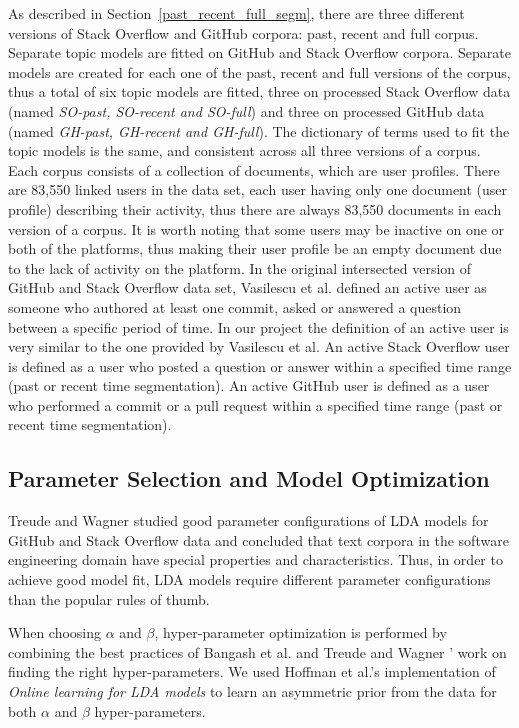         As described in Section~\ref{past_recent_full_segm}, there are three different versions of Stack Overflow and GitHub corpora: past, recent and full corpus. Separate topic models are fitted on GitHub and Stack Overflow corpora. Separate models are created for each one of the past, recent and full versions of the corpus, thus a total of six topic models are fitted, three on processed Stack Overflow data (named \emph{SO-past, SO-recent and SO-full}) and three on processed GitHub data (named \emph{GH-past, GH-recent and GH-full}). The dictionary of terms used to fit the topic models is the same, and consistent across all three versions of a corpus. Each corpus consists of a collection of documents, which are user profiles. There are 83,550 linked users in the data set, each user having only one document (user profile) describing their activity, thus there are always 83,550 documents in each version of a corpus. It is worth noting that some users may be inactive on one or both of the platforms, thus making their user profile be an empty document due to the lack of activity on the platform. In the original intersected version of GitHub and Stack Overflow data set, Vasilescu et al. \cite{vasilescu2013stackoverflow} defined an active user as someone who authored at least one commit, asked or answered a question between a specific period of time. In our project the definition of an active user is very similar to the one provided by Vasilescu et al. An active Stack Overflow user is defined as a user who posted a question or answer within a specified time range (past or recent time segmentation). An active GitHub user is defined as a user who performed a commit or a pull request within a specified time range (past or recent time segmentation).
    
    \subsection{Parameter Selection and Model Optimization}
    
        Treude and Wagner \cite{treude2019predicting} studied good parameter configurations of LDA models for GitHub and Stack Overflow data and concluded that text corpora in the software engineering domain have special properties and characteristics. Thus,  in order to achieve good model fit, LDA models require different parameter configurations than the popular rules of thumb.
        
        When choosing $\alpha$ and $\beta$, hyper-parameter optimization is performed by combining the best practices of Bangash et al. \cite{bangash2019developers} and Treude and Wagner \cite{treude2019predicting}' work on finding the right hyper-parameters. We used Hoffman et al.'s implementation of \textit{Online learning for LDA models} \cite{hoffman2010online} to learn an asymmetric prior from the data for both $\alpha$ and $\beta$ hyper-parameters.
        
